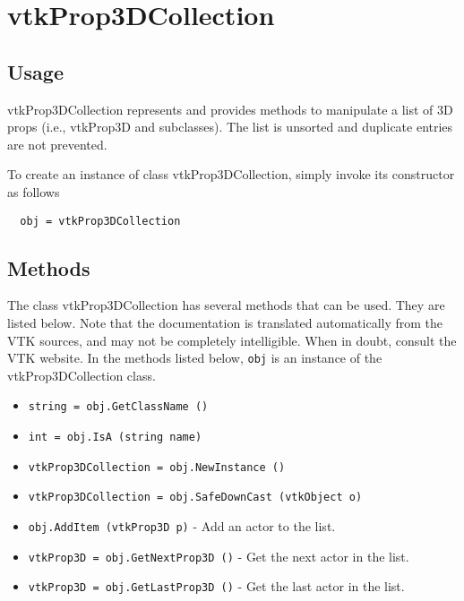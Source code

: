 \section{vtkProp3DCollection}

\subsection{Usage}

 vtkProp3DCollection represents and provides methods to manipulate a list of
 3D props (i.e., vtkProp3D and subclasses). The list is unsorted and 
 duplicate entries are not prevented.

To create an instance of class vtkProp3DCollection, simply
invoke its constructor as follows
\begin{verbatim}
  obj = vtkProp3DCollection
\end{verbatim}
\subsection{Methods}

The class vtkProp3DCollection has several methods that can be used.
  They are listed below.
Note that the documentation is translated automatically from the VTK sources,
and may not be completely intelligible.  When in doubt, consult the VTK website.
In the methods listed below, \verb|obj| is an instance of the vtkProp3DCollection class.
\begin{itemize}
\item  \verb|string = obj.GetClassName ()|

\item  \verb|int = obj.IsA (string name)|

\item  \verb|vtkProp3DCollection = obj.NewInstance ()|

\item  \verb|vtkProp3DCollection = obj.SafeDownCast (vtkObject o)|

\item  \verb|obj.AddItem (vtkProp3D p)| -  Add an actor to the list.

\item  \verb|vtkProp3D = obj.GetNextProp3D ()| -  Get the next actor in the list.

\item  \verb|vtkProp3D = obj.GetLastProp3D ()| -  Get the last actor in the list.

\end{itemize}
